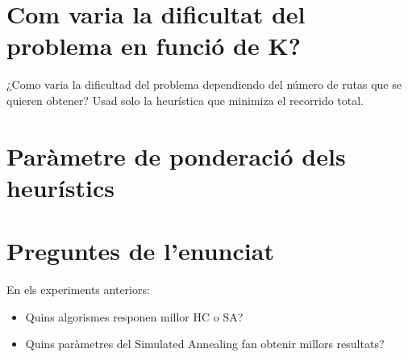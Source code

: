 
\section{Com varia la dificultat del problema en funció de K?} %
\label{sec:expk}

¿Como varia la dificultad del problema dependiendo del número de rutas que se quieren obtener? Usad solo la heurística que minimiza el recorrido total.


\newpage %
\section{Paràmetre de ponderació dels heurístics} %
\label{sec:expkh}



\section{Preguntes de l'enunciat} %
\label{sec:preguntes}

En els experiments anteriors:
\begin{itemize}
\item Quins algorismes responen millor HC o SA?
\item Quins paràmetres del Simulated Annealing fan obtenir millors resultats?
\end{itemize}

